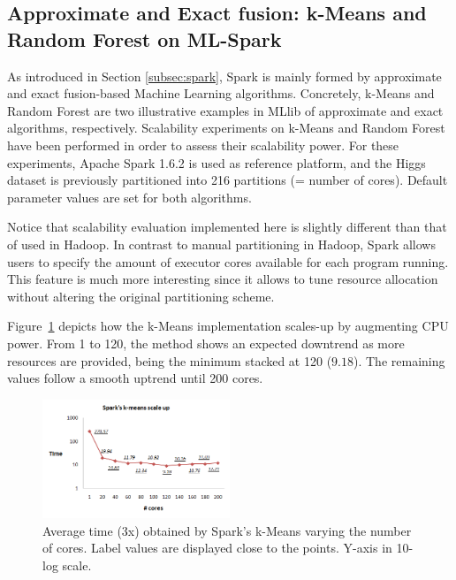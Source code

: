 \documentclass[3p,review]{elsarticle}
\begin{document}
\subsection{Approximate and Exact fusion: k-Means and Random Forest on ML-Spark}
\label{subsec:rfspark}

As introduced in Section \ref{subsec:spark}, Spark is mainly formed by approximate and exact fusion-based Machine Learning algorithms. Concretely, k-Means and Random Forest are two illustrative examples in MLlib of approximate and exact algorithms, respectively. Scalability experiments on k-Means and Random Forest have been performed in order to assess their scalability power. For these experiments, Apache Spark 1.6.2 is used as reference platform, and the Higgs dataset is previously partitioned into 216 partitions (= number of cores). Default parameter values are set for both algorithms.

Notice that scalability evaluation implemented here is slightly different than that of used in Hadoop. In contrast to manual partitioning in Hadoop, Spark allows users to specify the amount of executor cores available for each program running. This feature is much more interesting since it allows to tune resource allocation without altering the original partitioning scheme.

Figure~\ref{fig:kmeans-spark} depicts how the k-Means implementation scales-up by augmenting CPU power. From 1 to 120, the method shows an expected downtrend as more resources are provided, being the minimum stacked at 120 ($9.18$). The remaining values follow a smooth uptrend until 200 cores. 

\begin{figure}[!htp]
	\centering
	\includegraphics[width=0.5\textwidth]{kmeans-spark}
	\caption{Average time (3x) obtained by Spark's k-Means varying the number of cores. Label values are displayed close to the points. Y-axis in 10-log scale.}
	\label{fig:kmeans-spark}
\end{figure}
\end{document}
